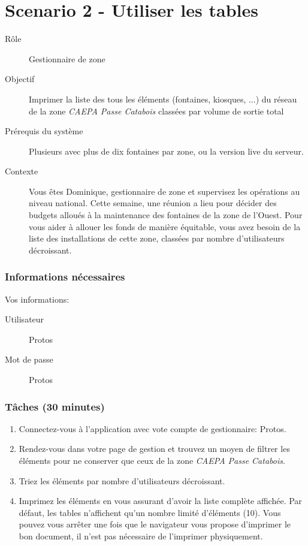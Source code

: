 \documentclass[a4paper, 11pt]{article}
\begin{document}
\section*{Scenario 2 - Utiliser les tables}
    \begin{description}
        \item[Rôle] Gestionnaire de zone
        \item[Objectif] Imprimer la liste des tous les éléments (fontaines, kiosques, ...) du réseau de la zone \emph{CAEPA Passe Catabois} classées par volume de sortie total
        \item[Prérequis du système] Plusieurs avec plus de dix fontaines par zone, ou la version live du serveur.
        \item[Contexte] Vous êtes Dominique, gestionnaire de zone et supervisez les opérations au niveau national. Cette semaine, une réunion a lieu pour décider des budgets alloués à la maintenance des fontaines de la zone de l'Ouest. Pour vous aider à allouer les fonds de manière équitable, vous avez besoin de la liste des installations de cette zone, classées par nombre d'utilisateurs décroissant.
    \end{description}

    \subsubsection*{Informations nécessaires}
        Vos informations:
        \begin{description}
            \item[Utilisateur] Protos
            \item[Mot de passe] Protos
        \end{description}
    \subsubsection*{Tâches (30 minutes)}
        \begin{enumerate}
            \item Connectez-vous à l'application avec vote compte de gestionnaire: Protos.
            \item Rendez-vous dans votre page de gestion et trouvez un moyen de filtrer les éléments pour ne conserver que ceux de la zone  \emph{CAEPA Passe Catabois}.
            \item Triez les éléments par nombre d'utilisateurs décroissant.
            \item Imprimez les éléments en vous assurant d'avoir la liste complète affichée. Par défaut, les tables n'affichent qu'un nombre limité d'éléments (10). Vous pouvez vous arrêter une fois que le navigateur vous propose d'imprimer le bon document, il n'est pas nécessaire de l'imprimer physiquement.
        \end{enumerate}
\end{document}
